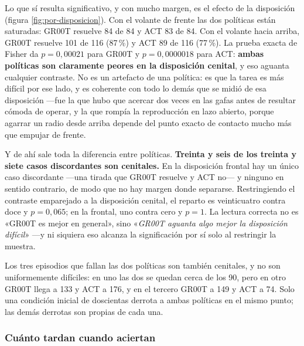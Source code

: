 Lo que sí resulta significativo, y con mucho margen, es el efecto de la disposición (figura
\ref{fig:por-disposicion}). Con el volante de frente las dos políticas están saturadas: GR00T
resuelve 84 de 84 y ACT 83 de 84. Con el volante hacia arriba, GR00T resuelve 101 de 116 (87\,\%) y
ACT 89 de 116 (77\,\%). La prueba exacta de Fisher da $p = 0{,}00021$ para GR00T y
$p = 0{,}0000018$ para ACT: \textbf{ambas políticas son claramente peores en la disposición
cenital}, y eso aguanta cualquier contraste. No es un artefacto de una política: es que la tarea es
más difícil por ese lado, y es coherente con todo lo demás que se midió de esa disposición —fue la
que hubo que acercar dos veces en las gafas antes de resultar cómoda de operar, y la que rompía la
reproducción en lazo abierto, porque agarrar un radio desde arriba depende del punto exacto de
contacto mucho más que empujar de frente.

Y de ahí sale toda la diferencia entre políticas. \textbf{Treinta y seis de los treinta y siete
casos discordantes son cenitales.} En la disposición frontal hay un único caso discordante —una
tirada que GR00T resuelve y ACT no— y ninguno en sentido contrario, de modo que no hay margen donde
separarse. Restringiendo el contraste emparejado a la disposición cenital, el reparto es
veinticuatro contra doce y $p = 0{,}065$; en la frontal, uno contra cero y $p = 1$. La lectura
correcta no es «GR00T es mejor en general», sino «\textit{GR00T aguanta algo mejor la disposición
difícil}» —y ni siquiera eso alcanza la significación por sí solo al restringir la muestra.

Los tres episodios que fallan las dos políticas son también cenitales, y no son uniformemente
difíciles: en uno las dos se quedan cerca de los 90\textdegree, pero en otro GR00T llega a
133\textdegree{} y ACT a 176\textdegree, y en el tercero GR00T a 149\textdegree{} y ACT a
74\textdegree. Solo una condición inicial de doscientas derrota a ambas políticas en el mismo
punto; las demás derrotas son propias de cada una.

\subsubsection{Cuánto tardan cuando aciertan}

\begin{table}[ht]
	\centering
	\caption{Pasos hasta cruzar el umbral de éxito, en los episodios con éxito}
	\label{tab:tiempos}
\end{table}

